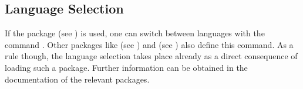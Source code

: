\subsection{Language Selection}
\label{sec:scrlttr2.switchLanguage}

If the package  (see
\cite{package:babel}) is used, one can switch between languages with
the command .  Other
packages like  (see
\cite{package:german}) and 
(see \cite{package:ngerman}) also define this command.  As a rule
though, the language selection takes place already as a direct
consequence of loading such a package. Further information can be
obtained in the documentation of the relevant packages.

